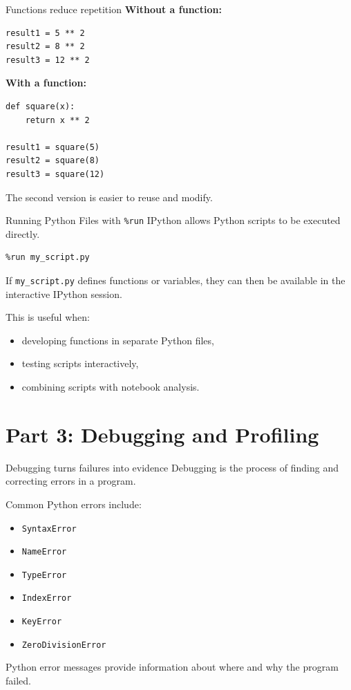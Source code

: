 \documentclass[11pt,aspectratio=43]{beamer}
\begin{document}
\begin{frame}[fragile]{Functions reduce repetition}
\textbf{Without a function:}

\begin{lstlisting}
result1 = 5 ** 2
result2 = 8 ** 2
result3 = 12 ** 2
\end{lstlisting}

\textbf{With a function:}

\begin{lstlisting}
def square(x):
    return x ** 2

result1 = square(5)
result2 = square(8)
result3 = square(12)
\end{lstlisting}

The second version is easier to reuse and modify.
\end{frame}

\begin{frame}[fragile]{Running Python Files with \texttt{\%run}}
IPython allows Python scripts to be executed directly.

\begin{lstlisting}
%run my_script.py
\end{lstlisting}

If \texttt{my\_script.py} defines functions or variables, they can then
be available in the interactive IPython session.

\vspace{0.3cm}
This is useful when:
\begin{itemize}
  \item developing functions in separate Python files,
  \item testing scripts interactively,
  \item combining scripts with notebook analysis.
\end{itemize}
\end{frame}

\section{Part 3: Debugging and Profiling}

\begin{frame}{Debugging turns failures into evidence}
Debugging is the process of finding and correcting errors in a program.

\vspace{0.3cm}
Common Python errors include:
\begin{itemize}
  \item \texttt{SyntaxError}
  \item \texttt{NameError}
  \item \texttt{TypeError}
  \item \texttt{IndexError}
  \item \texttt{KeyError}
  \item \texttt{ZeroDivisionError}
\end{itemize}

\vspace{0.3cm}
Python error messages provide information about where and why the program failed.
\end{frame}
\end{document}
